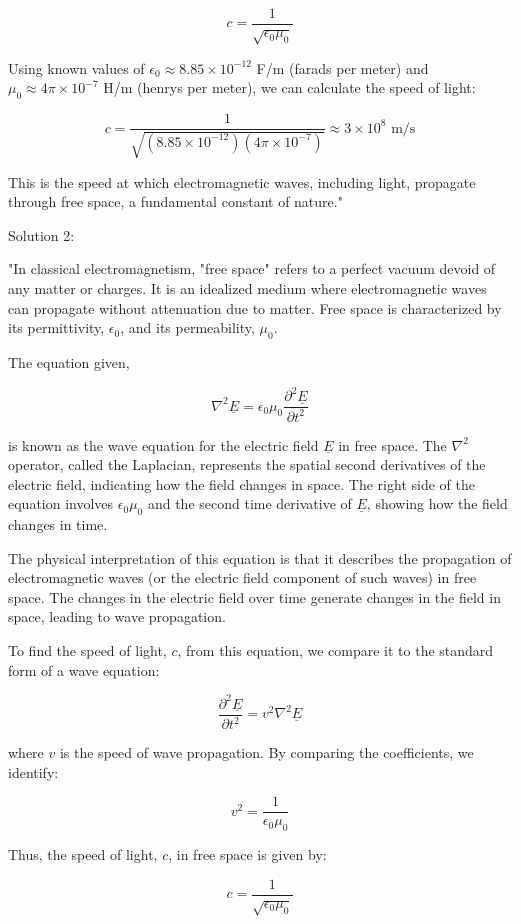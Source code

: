 \[
c = \frac{1}{\sqrt{\epsilon_{0}\mu_{0}}}
\]

Using known values of $\epsilon_{0} \approx 8.85 \times 10^{-12}$ F/m (farads per meter) and $\mu_{0} \approx 4\pi \times 10^{-7}$ H/m (henrys per meter), we can calculate the speed of light:

\[
c = \frac{1}{\sqrt{(8.85 \times 10^{-12})(4\pi \times 10^{-7})}} \approx 3 \times 10^8 \text{ m/s}
\]

This is the speed at which electromagnetic waves, including light, propagate through free space, a fundamental constant of nature."

Solution 2:

"In classical electromagnetism, "free space" refers to a perfect vacuum devoid of any matter or charges. It is an idealized medium where electromagnetic waves can propagate without attenuation due to matter. Free space is characterized by its permittivity, \(\epsilon_0\), and its permeability, \(\mu_0\).

The equation given,

\[
\nabla^{2}\underline{E} = \epsilon_{0}\mu_{0}\frac{\partial^2 \underline{E}}{\partial t^{2}}
\]

is known as the wave equation for the electric field \(\underline{E}\) in free space. The \(\nabla^{2}\) operator, called the Laplacian, represents the spatial second derivatives of the electric field, indicating how the field changes in space. The right side of the equation involves \(\epsilon_{0}\mu_{0}\) and the second time derivative of \(\underline{E}\), showing how the field changes in time.

The physical interpretation of this equation is that it describes the propagation of electromagnetic waves (or the electric field component of such waves) in free space. The changes in the electric field over time generate changes in the field in space, leading to wave propagation.

To find the speed of light, \(c\), from this equation, we compare it to the standard form of a wave equation:

\[
\frac{\partial^2 \underline{E}}{\partial t^{2}} = v^2 \nabla^{2}\underline{E}
\]

where \(v\) is the speed of wave propagation. By comparing the coefficients, we identify:

\[
v^2 = \frac{1}{\epsilon_{0}\mu_{0}}
\]

Thus, the speed of light, \(c\), in free space is given by:

\[
c = \frac{1}{\sqrt{\epsilon_{0}\mu_{0}}}
\]

